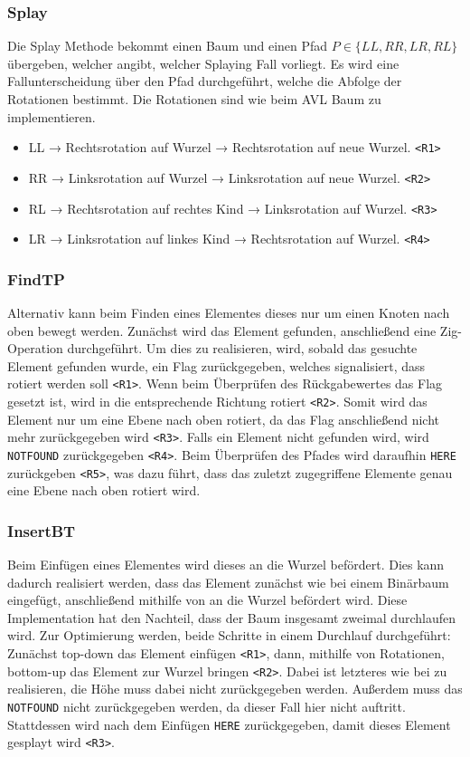 \subsubsection{Splay}\label{par:splay}
Die Splay Methode bekommt einen Baum und einen Pfad \(P \in \{LL, RR, LR, RL\}\) übergeben,
welcher angibt, welcher Splaying Fall vorliegt.
Es wird eine Fallunterscheidung über den Pfad durchgeführt, welche die Abfolge der Rotationen
bestimmt.
Die Rotationen sind wie beim AVL Baum zu implementieren.
\begin{itemize}
    \item LL → Rechtsrotation auf Wurzel → Rechtsrotation auf neue Wurzel. \verb|<R1>|
    \item RR → Linksrotation auf Wurzel → Linksrotation auf neue Wurzel. \verb|<R2>|
    \item RL → Rechtsrotation auf rechtes Kind → Linksrotation auf Wurzel. \verb|<R3>|
    \item LR → Linksrotation auf linkes Kind → Rechtsrotation auf Wurzel. \verb|<R4>|
\end{itemize}

\subsubsection{FindTP}
Alternativ kann beim Finden eines Elementes dieses nur um einen Knoten nach oben bewegt werden.
Zunächst wird das Element gefunden, anschließend eine Zig-Operation durchgeführt.
Um dies zu realisieren, wird, sobald das gesuchte Element gefunden wurde, ein Flag zurückgegeben,
welches signalisiert, dass rotiert werden soll \verb|<R1>|.
Wenn beim Überprüfen des Rückgabewertes das Flag gesetzt ist, wird in die entsprechende Richtung
rotiert \verb|<R2>|.
Somit wird das Element nur um eine Ebene nach oben rotiert, da das Flag anschließend nicht mehr
zurückgegeben wird \verb|<R3>|.
Falls ein Element nicht gefunden wird, wird \verb|NOTFOUND| zurückgegeben \verb|<R4>|.
Beim Überprüfen des Pfades wird daraufhin \verb|HERE| zurückgeben \verb|<R5>|, was dazu führt, dass
das zuletzt zugegriffene Elemente genau eine Ebene nach oben rotiert wird.

\subsubsection{InsertBT}
Beim Einfügen eines Elementes wird dieses an die Wurzel befördert.
Dies kann dadurch realisiert werden, dass das Element zunächst wie bei einem Binärbaum
eingefügt, anschließend mithilfe von  an die Wurzel befördert wird.
Diese Implementation hat den Nachteil, dass der Baum insgesamt zweimal durchlaufen wird.
Zur Optimierung werden, beide Schritte in einem Durchlauf durchgeführt: Zunächst top-down
das Element einfügen \verb|<R1>|, dann, mithilfe von Rotationen, bottom-up das Element zur Wurzel
bringen \verb|<R2>|.
Dabei ist letzteres wie bei  zu realisieren,
die Höhe muss dabei nicht zurückgegeben werden.
Außerdem muss das \verb|NOTFOUND| nicht zurückgegeben werden, da dieser Fall hier nicht auftritt.
Stattdessen wird nach dem Einfügen \verb|HERE| zurückgegeben, damit dieses Element gesplayt wird
\verb|<R3>|.

